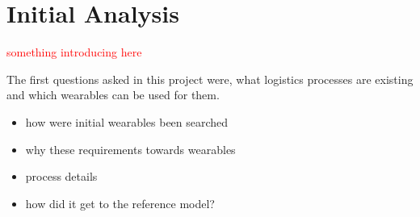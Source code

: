 \chapter{Initial Analysis}\label{cha:initialAnalysis}
\textcolor{red}{something introducing here}

The first questions asked in this project were, what logistics processes are existing and which wearables can be used for them. 
\begin{itemize}
	\item how were initial wearables been searched
	\item why these requirements towards wearables
	\item process details
	\item how did it get to the reference model?
\end{itemize}